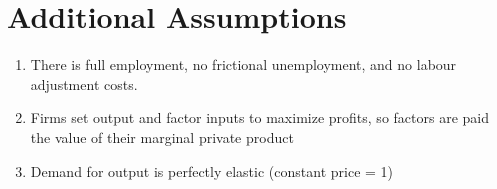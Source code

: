 
\section{Additional Assumptions}
\begin{enumerate}
\item There is full employment, no frictional unemployment, and no labour adjustment costs.
\item Firms set output and factor inputs to maximize profits, so factors are paid the value of their marginal private product
\item Demand for output is perfectly elastic (constant price = 1)
\end{enumerate}
